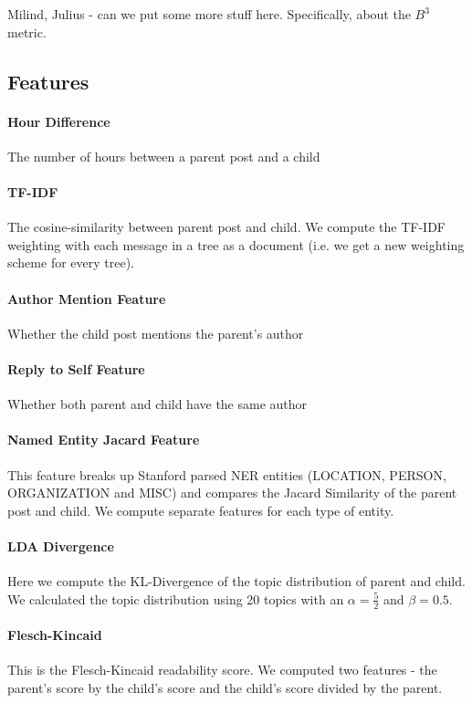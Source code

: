 \documentclass[10pt]{article}
\begin{document}
Milind, Julius - can we put some more stuff here. 
Specifically, about the $B^3$ metric.

\subsection{Features}
\paragraph{Hour Difference} The number of hours between a parent post and a child

\paragraph{TF-IDF} The cosine-similarity between parent post and child. We compute the 
TF-IDF weighting with each message in a tree as a document (i.e. we get a new weighting
scheme for every tree).

\paragraph{Author Mention Feature} Whether the child post mentions the parent's author

\paragraph{Reply to Self Feature} Whether both parent and child have the same author

\paragraph{Named Entity Jacard Feature} This feature breaks up Stanford parsed NER
entities (LOCATION, PERSON, ORGANIZATION and MISC) and compares the Jacard Similarity
of the parent post and child. We compute separate features for each type of entity.

\paragraph{LDA Divergence} Here we compute the KL-Divergence of the topic distribution
of parent and child. We calculated the topic distribution using 20 topics with
an $\alpha=\frac{5}{2}$ and $\beta = 0.5$.

\paragraph{Flesch-Kincaid} This is the Flesch-Kincaid readability score. We computed
two features - the parent's score by the child's score and the child's score divided
by the parent.
\end{document}
